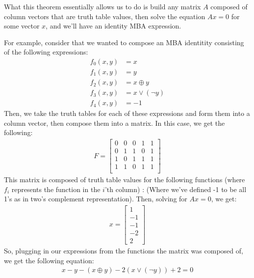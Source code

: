\par What this theorem essentially allows us to do is build any matrix $A$
composed of column vectors that are truth table values, then solve the 
equation $Ax = 0$ for some vector $x$, and we'll have an identity MBA expression.
\par For example, consider that we wanted to compose an MBA identitity consisting 
of the following expressions:
\begin{align*}
    f_0(x,y) &= x\\
    f_1(x,y) &= y\\
    f_2(x,y) &= x \oplus y\\
    f_3(x,y) &= x \lor (\neg y)\\
    f_4(x,y) &= -1
\end{align*}
Then, we take the truth tables for each of these expressions and form them
into a column vector, then compose them into a matrix. In this case, we get 
the following:
\begin{align*}
    F = \begin{bmatrix}
        0 & 0 & 0 & 1 & 1\\
        0 & 1 & 1 & 0 & 1\\
        1 & 0 & 1 & 1 & 1\\
        1 & 1 & 0 & 1 & 1\\
    \end{bmatrix}
\end{align*}
This matrix is composed of truth table values for the following functions (where 
$f_i$ represents the function in the $i$'th column) :
(Where we've defined -1 to be all 1's as in two's complement representation).
Then, solving for $Ax = 0$, we get:
\begin{align*}
    x = \begin{bmatrix}
    1\\-1\\-1\\-2\\2
    \end{bmatrix}
\end{align*}
So, plugging in our expressions from the functions the matrix was composed of, 
we get the following equation:
\begin{align*}
    x - y - (x \oplus y) -2(x \lor (\neg y)) + 2 =0
\end{align*}

